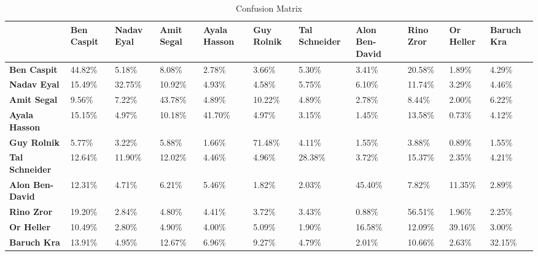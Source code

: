\documentclass[a4paper]{article}
\begin{document}
\begin{appendices}
\begin{table}[htbp]
	\centering
		\begin{tabular}{|p{1.1cm}|p{1.1cm}|p{1.1cm}|p{1.1cm}|p{1.1cm}|p{1.1cm}|p{1.1cm}|p{1.1cm}|p{1.1cm}|p{1.1cm}|p{1.1cm}|}
		\hline
		& \textbf{Ben Caspit} & \textbf{Nadav Eyal} & \textbf{Amit Segal} & \textbf{Ayala Hasson} & \textbf{Guy Rolnik} & \textbf{Tal Schneider} & \textbf{Alon Ben-David} & \textbf{Rino Zror} & \textbf{Or Heller} & \textbf{Baruch Kra} \\ \hline
		\textbf{Ben Caspit} & 44.82\% & 5.18\% & 8.08\% & 2.78\% & 3.66\% & 5.30\% & 3.41\% & 20.58\% & 1.89\% & 4.29\% \\ \hline
		\textbf{Nadav Eyal} & 15.49\% & 32.75\% & 10.92\% & 4.93\% & 4.58\% & 5.75\% & 6.10\% & 11.74\% & 3.29\% & 4.46\%\\ \hline
		\textbf{Amit Segal} & 9.56\% & 7.22\% & 43.78\% & 4.89\% & 10.22\% & 4.89\% & 2.78\% & 8.44\% & 2.00\% & 6.22\%\\ \hline
		\textbf{Ayala Hasson} & 15.15\% & 4.97\% & 10.18\% & 41.70\% & 4.97\% & 3.15\% & 1.45\% & 13.58\% & 0.73\% & 4.12\%\\ \hline
		\textbf{Guy Rolnik} & 5.77\% & 3.22\% & 5.88\% & 1.66\% & 71.48\% & 4.11\% & 1.55\% & 3.88\% & 0.89\% & 1.55\%\\ \hline
		\textbf{Tal Schneider} & 12.64\% & 11.90\% & 12.02\% & 4.46\% & 4.96\% & 28.38\% & 3.72\% & 15.37\% & 2.35\% & 4.21\%\\ \hline
		\textbf{Alon Ben-David} & 12.31\% & 4.71\% & 6.21\% & 5.46\% & 1.82\% & 2.03\% & 45.40\% & 7.82\% & 11.35\% & 2.89\%\\ \hline
		\textbf{Rino Zror} & 19.20\% & 2.84\% & 4.80\% & 4.41\% & 3.72\% & 3.43\% & 0.88\% & 56.51\% & 1.96\% & 2.25\%\\ \hline
		\textbf{Or Heller} & 10.49\% & 2.80\% & 4.90\% & 4.00\% & 5.09\% & 1.90\% & 16.58\% & 12.09\% & 39.16\% & 3.00\%\\ \hline
		\textbf{Baruch Kra} & 13.91\% & 4.95\% & 12.67\% & 6.96\% & 9.27\% & 4.79\% & 2.01\% & 10.66\% & 2.63\% & 32.15\%\\ \hline		
		\end{tabular}
\caption{Confusion Matrix}
\label{tab:confusion matrix}
\end{table}

\end{appendices}
\end{document}
